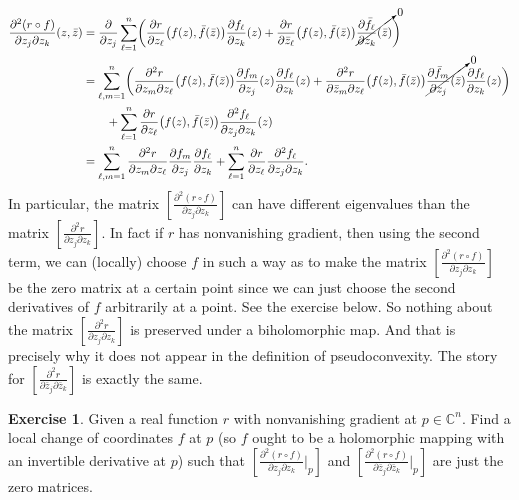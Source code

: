 \documentclass[12pt,openany]{book}
\newcommand{\C}{{\mathbb{C}}}
\theoremstyle{plain}
\theoremstyle{remark}
\theoremstyle{definition}
\newenvironment{exbox}{%
    \def\FrameCommand{\vrule width 1pt \relax\hspace {10pt}}%
    \MakeFramed {\advance \hsize -\width \FrameRestore }%
}{%
    \endMakeFramed
}
\theoremstyle{exercise}
\newtheorem{exercise}{Exercise}[section]
\theoremstyle{example}
\begin{document}
\begin{equation} \label{eq:nonmixedderschangeofcoords}
\begin{split}
\frac{\partial^2 (r \circ f)}{\partial z_j \partial z_k} (z,\bar{z})
& =
\frac{\partial}{\partial z_j }
\sum_{\ell=1}^n 
\biggl(
\frac{\partial r}{\partial z_\ell} \bigl(f(z),\bar{f}(\bar{z})\bigr)
\frac{\partial f_\ell}{\partial z_k} (z) 
+
\frac{\partial r}{\partial \bar{z}_\ell} \bigl(f(z),\bar{f}(\bar{z})\bigr)
\cancelto{0}{\frac{\partial \bar{f}_\ell}{\partial z_k} (\bar{z})}
\biggr)
\\
& =
\sum_{\ell,m=1}^n 
\biggl(
\frac{\partial^2 r}{\partial z_m \partial z_\ell}
\bigl(f(z),\bar{f}(\bar{z})\bigr)
\frac{\partial f_m}{\partial z_j} (z) 
\frac{\partial f_\ell}{\partial z_k} (z) 
+
\frac{\partial^2 r}{\partial \bar{z}_m \partial z_\ell} \bigl(f(z),\bar{f}(\bar{z})\bigr)
\cancelto{0}{\frac{\partial \bar{f}_m}{\partial z_j} (\bar{z}) }
\frac{\partial f_\ell}{\partial z_k} (z) 
\biggr)
\\
& \qquad +
\sum_{\ell=1}^n 
\frac{\partial r}{\partial z_\ell} \bigl(f(z),\bar{f}(\bar{z})\bigr)
\frac{\partial^2 f_\ell}{\partial z_j \partial z_k} (z)
\\
&=
\sum_{\ell,m=1}^n 
\frac{\partial^2 r}{\partial z_m \partial z_\ell}
\frac{\partial f_m}{\partial z_j}
\frac{\partial f_\ell}{\partial z_k}
+
\sum_{\ell=1}^n 
\frac{\partial r}{\partial z_\ell}
\frac{\partial^2 f_\ell}{\partial z_j \partial z_k} .
\end{split}
\end{equation}
In particular, the matrix 
$\left[ \frac{\partial^2 (r \circ f)}{\partial z_j \partial z_k} \right]$
can have different eigenvalues than the matrix
$\left[ \frac{\partial^2 r}{\partial z_j \partial z_k} \right]$.  In fact
if $r$ has nonvanishing gradient, then
using the second term, we can (locally) choose $f$ in such a way as to make
the matrix
$\left[ \frac{\partial^2 (r \circ f)}{\partial z_j \partial z_k} \right]$
be the zero matrix at a certain point since we can just choose the second
derivatives of $f$ arbitrarily at a point.  See the exercise below.  So nothing about the matrix
$\left[ \frac{\partial^2 r}{\partial z_j \partial z_k} \right]$ is
preserved under a biholomorphic map.  And that is precisely why it does not
appear in the definition of pseudoconvexity.
The story for
$\left[ \frac{\partial^2 r}{\partial \bar{z}_j \partial \bar{z}_k} \right]$ is
exactly the same.

\begin{exbox}
\begin{exercise}
Given a real function $r$ with nonvanishing gradient at $p \in \C^n$.  Find
a local change of coordinates $f$ at $p$ (so $f$ ought to be a holomorphic
mapping with an invertible derivative at $p$) such that 
$\left[ \frac{\partial^2 (r \circ f)}{\partial z_j \partial z_k} \Big|_p \right]$
and
$\left[ \frac{\partial^2 (r \circ f)}{\partial \bar{z}_j \partial \bar{z}_k}
\Big|_p \right]$
are just the zero matrices.
\end{exercise}
\end{exbox}
\end{document}
